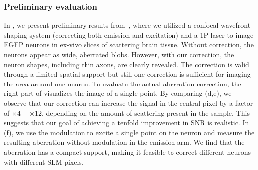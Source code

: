 \subsubsection{Preliminary evaluation}
In , we present preliminary results from~\cite{DrorNatureComm24}, where we utilized a confocal wavefront shaping system (correcting both emission and excitation) and a 1P laser to image EGFP neurons in ex-vivo slices of scattering brain tissue. Without correction, the neurons appear as wide, aberrated blobs. However, with our correction, the neuron shapes, including thin axons, are clearly revealed. The correction is valid through a limited spatial support but still one correction is sufficient for imaging the area around one neuron. 
To evaluate the actual aberration correction, the right part of  visualizes the image of a single point. By comparing (d,e), we observe that our correction can increase the signal in the central pixel by a factor of  $\times4-\times 12$, depending on the amount of scattering present in the sample. This suggests that our goal of achieving a tenfold improvement in SNR is realistic.
In (f), we use the modulation to excite a single point on the neuron and measure the resulting aberration without modulation in the emission arm. We find that the aberration has a compact support, making it feasible to correct different neurons with different SLM pixels.



